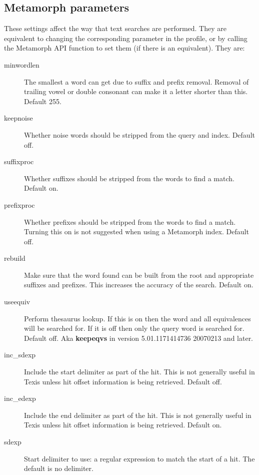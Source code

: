 \subsection{Metamorph parameters}

These settings affect the way that text searches are performed.  They are
equivalent to changing the corresponding parameter in the profile, or by
calling the Metamorph API function to set them (if there is an equivalent).
They are:

\begin{description}
\item[minwordlen] The smallest a word can get due to suffix and prefix
removal.  Removal of trailing vowel or double consonant can make it a
letter shorter than this.  Default 255.

\item[keepnoise] Whether noise words should be stripped from the query
and index.  Default off.

\item[suffixproc] Whether suffixes should be stripped from the words to
find a match.  Default on.

\item[prefixproc] Whether prefixes should be stripped from the words to
find a match.  Turning this on is not suggested when using a Metamorph
index.  Default off.


\item[rebuild] Make sure that the word found can be built from the root
and appropriate suffixes and prefixes.  This increases the accuracy of
the search.  Default on.

\item[useequiv] Perform thesaurus lookup.  If this is on then the word
and all equivalences will be searched for.  If it is off then only the
query word is searched for.  Default off.  Aka {\bf keepeqvs}
in version 5.01.1171414736 20070213 and later.

\item[inc\_sdexp]
  Include the start delimiter as part of the hit.  This is not
generally useful in Texis unless hit offset information is being
retrieved.  Default off.

\item[inc\_edexp]
  Include the end delimiter as part of the hit.  This is not
generally useful in Texis unless hit offset information is being
retrieved.  Default on.

\item[sdexp]  Start delimiter to use: a regular expression to match
the start of a hit.  The default is no delimiter.


\end{description}
